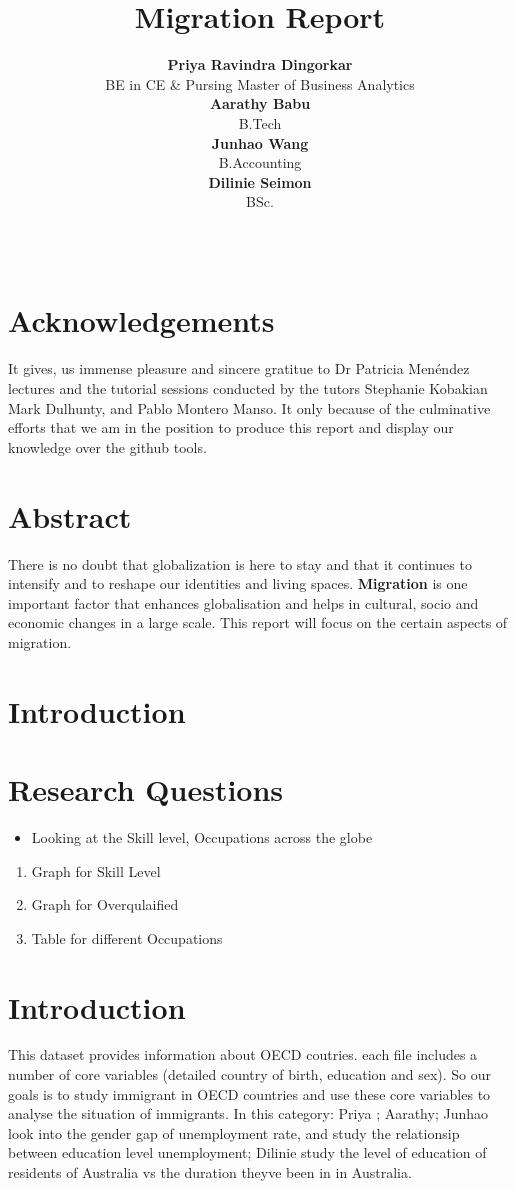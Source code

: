 \documentclass[11pt,a4paper,]{article}
\title{Migration Report}
\author{\sf\Large\textbf{ Priya Ravindra Dingorkar}\\ {\sf\large BE in CE \& Pursing Master of Business Analytics\\[0.5cm]} \sf\Large\textbf{ Aarathy Babu}\\ {\sf\large B.Tech\\[0.5cm]} \sf\Large\textbf{ Junhao Wang}\\ {\sf\large B.Accounting\\[0.5cm]} \sf\Large\textbf{ Dilinie Seimon}\\ {\sf\large BSc.\\[0.5cm]}}
\date{\sf\Date~\Month~\Year}
\makeatletter
\providecommand{\tightlist}{%
  \setlength{\itemsep}{0pt}\setlength{\parskip}{0pt}}
\def\titlepage{\front{\expandafter{\@title}}{\@author}{\@organization}}
\makeatother
\begin{document}
\titlepage

\section*{Acknowledgements}

It gives, us immense pleasure and sincere gratitue to Dr Patricia Menéndez lectures and the tutorial sessions conducted by the tutors Stephanie Kobakian Mark Dulhunty, and Pablo Montero Manso. It only because of the culminative efforts that we am in the position to produce this report and display our knowledge over the github tools.

\section*{Abstract}

There is no doubt that globalization is here to stay and that it continues to intensify and to reshape our identities and living spaces. \textbf{Migration} is one important factor that enhances globalisation and helps in cultural, socio and economic changes in a large scale. This report will focus on the certain aspects of migration.

\section*{Introduction}

\section*{Research Questions}

\begin{itemize}
\tightlist
\item
  Looking at the Skill level, Occupations across the globe
\end{itemize}

\begin{enumerate}
   \item Graph for Skill Level
   \item Graph for Overqulaified 
   \item Table for different Occupations
 \end{enumerate}

\section*{Introduction}

This dataset provides information about OECD coutries. each file includes a number of core variables (detailed country of birth, education and sex). So our goals is to study immigrant in OECD countries and use these core variables to analyse the situation of immigrants. In this category: Priya ; Aarathy; Junhao look into the gender gap of unemployment rate, and study the relationsip between education level unemployment; Dilinie study the level of education of residents of Australia vs the duration theyve been in in Australia.
\end{document}
